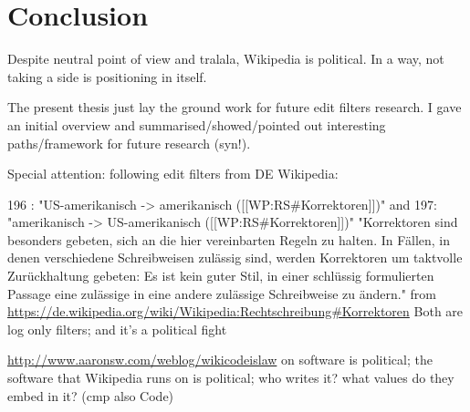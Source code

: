 %
\chapter{Conclusion}
\label{chap:conclusion}

Despite neutral point of view and tralala, Wikipedia is political.
In a way, not taking a side is positioning in itself.

The present thesis just lay the ground work for future edit filters research.
I gave an initial overview and summarised/showed/pointed out interesting paths/framework for future research (syn!).


Special attention: following edit filters from DE Wikipedia:

196 : "US-amerikanisch -> amerikanisch ([[WP:RS\#Korrektoren]])"
and 197: "amerikanisch -> US-amerikanisch ([[WP:RS\#Korrektoren]])"
"Korrektoren sind besonders gebeten, sich an die hier vereinbarten Regeln zu halten. In Fällen, in denen verschiedene Schreibweisen zulässig sind, werden Korrektoren um taktvolle Zurückhaltung gebeten: Es ist kein guter Stil, in einer schlüssig formulierten Passage eine zulässige in eine andere zulässige Schreibweise zu ändern." from \url{https://de.wikipedia.org/wiki/Wikipedia:Rechtschreibung#Korrektoren}
Both are log only filters;
and it's a political fight



\url{http://www.aaronsw.com/weblog/wikicodeislaw}
on software is political; the software that Wikipedia runs on is political; who writes it? what values do they embed in it? (cmp also Code)

